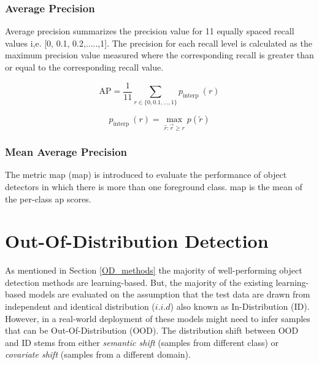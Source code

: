     \subsubsection{Average Precision}
    Average precision summarizes the precision value for 11 equally spaced recall values i,e. [0, 0.1, 0.2,.....,1]. The precision for each recall level is calculated as the maximum precision value measured where the corresponding recall is greater than or equal to the corresponding recall value.
    
        \begin{equation}
            \mathrm{AP}=\frac{1}{11} \sum_{r \in\{0,0.1, \ldots, 1\}} p_{\text {interp }}(r)
        \end{equation}
        
        \begin{equation}
            p_{\text {interp }}(r)=\max _{\hat{r}: \vec{r} \geq r} p(\tilde{r})
        \end{equation}
    
    \subsubsection{Mean Average Precision}
    The metric \acrlong{map} (\acrshort{map}) is introduced to evaluate the performance of object detectors in which there is more than one foreground class. \acrshort{map} is the mean of the per-class \acrshort{ap} scores.

    \section{Out-Of-Distribution Detection}
    \label{OOD_Detection}
    As mentioned in Section \ref{OD_methods} the majority of well-performing object detection methods are learning-based. But, the majority of the existing learning-based models are evaluated on the assumption that the test data are drawn from independent and identical distribution ($i.i.d$) also known as In-Distribution (ID). However, in a real-world deployment of these models might need to infer samples that can be Out-Of-Distribution (OOD). The distribution shift between OOD and ID stems from either \textit{semantic shift} (samples from different class)  or \textit{covariate shift} (samples from a different domain). 
    
